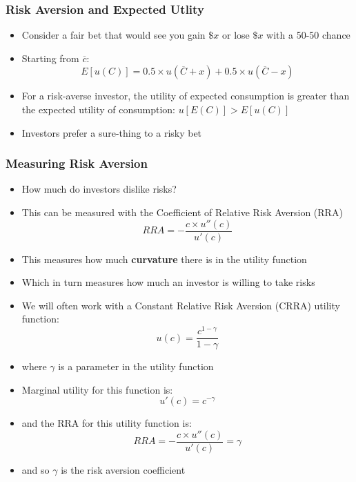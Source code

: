 \documentclass{article}
\numberwithin{equation}{section}
\numberwithin{figure}{section}
\begin{document}
\subsubsection{Risk Aversion and Expected Utlity}
	\begin{itemize}
		\item Consider a fair bet that would see you gain \( \$x \) or lose \( \$x \) with a 50-50 chance
		\item Starting from \( \overline{c} \):
		\[
			E[u(C)] = 0.5 \times u(\overline{C}+x) + 0.5 \times u(\overline{C}-x)
		\]
		\item For a risk-averse investor, the utility of expected consumption is greater than the expected utility of consumption: \( u[E(C)] > E[u(C)] \)
		\item \textcolor{myblue}{Investors prefer a sure-thing to a risky bet}
	\end{itemize}
\subsubsection{Measuring Risk Aversion}
	\begin{itemize}
		\item How much do investors dislike risks?
		\item This can be measured with the \textcolor{myblue}{Coefficient of Relative Risk Aversion} (RRA)
		\[
			RRA = -\frac{c \times u''(c)}{u'(c)}
		\]
		\item This measures how much \textbf{curvature} there is in the utility function
		\item Which in turn measures how much an investor is willing to take risks
		\item We will often work with a \textcolor{myblue}{Constant Relative Risk Aversion} (CRRA) utility function:
		\[
			u(c) = \frac{c^{1-\gamma}}{1-\gamma}
		\]
		\item where \( \gamma \) is a parameter in the utility function
		\item Marginal utility for this function is:
		\[
			u'(c)=c^{-\gamma}
		\]
		\item and the RRA for this utility function is:
		\[
			RRA = -\frac{c \times u''(c)}{u'(c)} = \gamma
		\]
		\item and so \( \gamma \) is the risk aversion coefficient
	\end{itemize}
\end{document}
